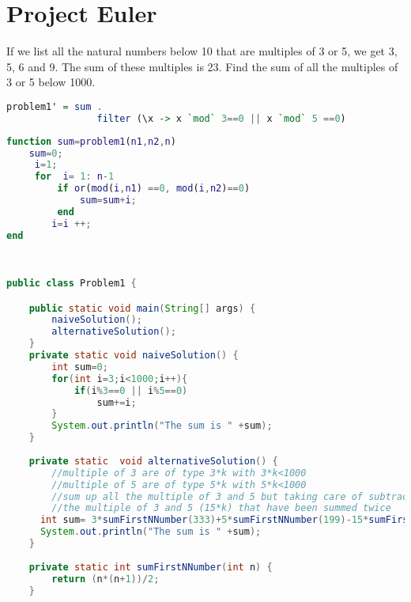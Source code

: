 \chapter{Project Euler}

\begin{problem}
If we list all the natural numbers below 10 that are multiples of 3 or 5, we get 3, 5, 6 and 9. The sum of these multiples is 23.
Find the sum of all the multiples of 3 or 5 below 1000.
 \end{problem}
 
 \begin{solution}

\begin{lstlisting}[language=Haskell, caption="Haskell"]
	problem1' = sum . 
	            filter (\x -> x `mod` 3==0 || x `mod` 5 ==0)
\end{lstlisting}


\begin{lstlisting}[language=Matlab, caption="Matlab"]
function sum=problem1(n1,n2,n)
	sum=0;
	 i=1;
     for  i= 1: n-1  
         if or(mod(i,n1) ==0, mod(i,n2)==0)
             sum=sum+i;
         end
	    i=i ++;
end   
\end{lstlisting}                         

\begin{lstlisting}[language=Java, caption="Java"]
                         

public class Problem1 {

	public static void main(String[] args) {
		naiveSolution();	
		alternativeSolution();
	}	
	private static void naiveSolution() {
		int sum=0;
		for(int i=3;i<1000;i++){
			if(i%3==0 || i%5==0)
				sum+=i;
		}
		System.out.println("The sum is " +sum);		
	}
	
	private static  void alternativeSolution() {
		//multiple of 3 are of type 3*k with 3*k<1000
		//multiple of 5 are of type 5*k with 5*k<1000
		//sum up all the multiple of 3 and 5 but taking care of subtracting once
		//the multiple of 3 and 5 (15*k) that have been summed twice
	  int sum= 3*sumFirstNNumber(333)+5*sumFirstNNumber(199)-15*sumFirstNNumber(66);
	  System.out.println("The sum is " +sum);	
	}
	
	private static int sumFirstNNumber(int n) {
		return (n*(n+1))/2;
	}
\end{lstlisting}

\end{solution}

